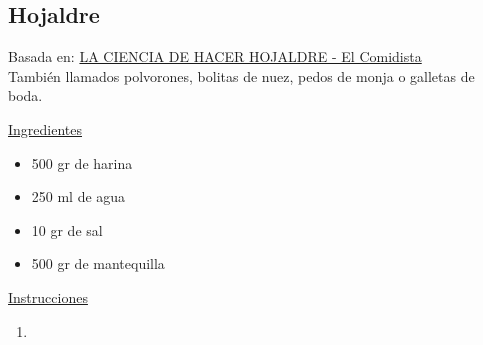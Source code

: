 \subsection{Hojaldre}

Basada en: \href{https://elcomidista.elpais.com/elcomidista/2017/02/08/receta/1486577378_084473.html}{LA CIENCIA DE HACER HOJALDRE - El Comidista} \\

También llamados polvorones, bolitas de nuez, pedos de monja o galletas de boda.

\underline{Ingredientes}

\begin{itemize}
\item 500 gr de harina
\item 250 ml de agua
\item 10 gr de sal
\item 500 gr de mantequilla
\end{itemize}


\underline{Instrucciones}

\begin{enumerate}
\item 
\end{enumerate}

